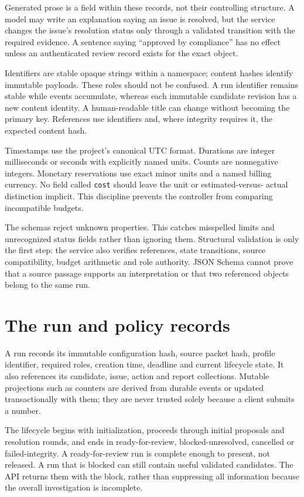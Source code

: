 \documentclass[12pt,a4paper,oneside,openany]{book}
\begin{document}
Generated prose is a field within these records, not their controlling structure.
A model may write an explanation saying an issue is resolved, but the service
changes the issue's resolution status only through a validated transition with
the required evidence. A sentence saying ``approved by compliance'' has no effect
unless an authenticated review record exists for the exact object.

Identifiers are stable opaque strings within a namespace; content hashes identify
immutable payloads. These roles should not be confused. A run identifier remains
stable while events accumulate, whereas each immutable candidate revision has a
new content identity. A human-readable title can change without becoming the
primary key. References use identifiers and, where integrity requires it, the
expected content hash.

Timestamps use the project's canonical UTC format. Durations are integer
milliseconds or seconds with explicitly named units. Counts are nonnegative
integers. Monetary reservations use exact minor units and a named billing
currency. No field called \texttt{cost} should leave the unit or estimated-versus-
actual distinction implicit. This discipline prevents the controller from
comparing incompatible budgets.

The schemas reject unknown properties. This catches misspelled limits and
unrecognized status fields rather than ignoring them. Structural validation is
only the first step: the service also verifies references, state transitions,
source compatibility, budget arithmetic and role authority. JSON Schema cannot
prove that a source passage supports an interpretation or that two referenced
objects belong to the same run.

\section{The run and policy records}

A run records its immutable configuration hash, source packet hash, profile
identifier, required roles, creation time, deadline and current lifecycle state.
It also references its candidate, issue, action and report collections. Mutable
projections such as counters are derived from durable events or updated
transactionally with them; they are never trusted solely because a client submits
a number.

The lifecycle begins with initialization, proceeds through initial proposals and
resolution rounds, and ends in ready-for-review, blocked-unresolved, cancelled or
failed-integrity. A ready-for-review run is complete enough to present, not
released. A run that is blocked can still contain useful validated candidates.
The API returns them with the block, rather than suppressing all information
because the overall investigation is incomplete.
\end{document}
